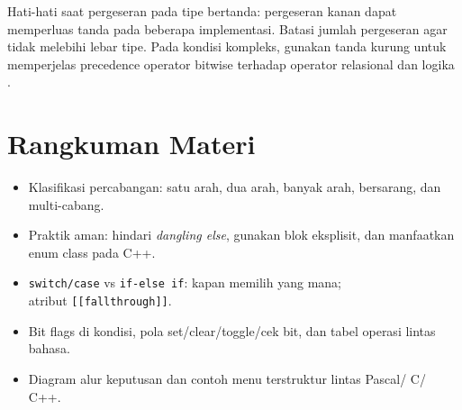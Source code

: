 \documentclass[../main.tex]{subfiles}
\begin{document}
Hati-hati saat pergeseran pada tipe bertanda: pergeseran kanan dapat memperluas tanda pada beberapa implementasi. Batasi jumlah pergeseran agar tidak melebihi lebar tipe. Pada kondisi kompleks, gunakan tanda kurung untuk memperjelas precedence operator bitwise terhadap operator relasional dan logika \parencite{iso-c-draft-n1570,cpp-reference}.

\section{Rangkuman Materi}
\begin{itemize}
  \item Klasifikasi percabangan: satu arah, dua arah, banyak arah, bersarang, dan multi-cabang.
  \item Praktik aman: hindari \emph{dangling else}, gunakan blok eksplisit, dan manfaatkan enum class pada C++.
  \item \texttt{switch/case} vs \texttt{if-else if}: kapan memilih yang mana;\\atribut \texttt{[[fall\-through]]}.
  \item Bit flags di kondisi, pola set/clear/toggle/cek bit, dan tabel operasi lintas bahasa.
  \item Diagram alur keputusan dan contoh menu terstruktur lintas Pascal/ C/ C++.
\end{itemize}
\end{document}
